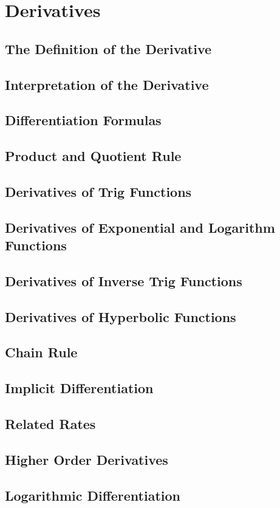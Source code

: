 \documentclass[../satmath.tex]{subfiles}
\begin{document}
\chapter{Derivatives}
\section{The Definition of the Derivative}
\section{Interpretation of the Derivative}
\section{Differentiation Formulas}
\section{Product and Quotient Rule}
\section{Derivatives of Trig Functions}
\section{Derivatives of Exponential and Logarithm Functions}
\section{Derivatives of Inverse Trig Functions}
\section{Derivatives of Hyperbolic Functions}
\section{Chain Rule}
\section{Implicit Differentiation}
\section{Related Rates}
\section{Higher Order Derivatives}
\section{Logarithmic Differentiation}
\end{document}
